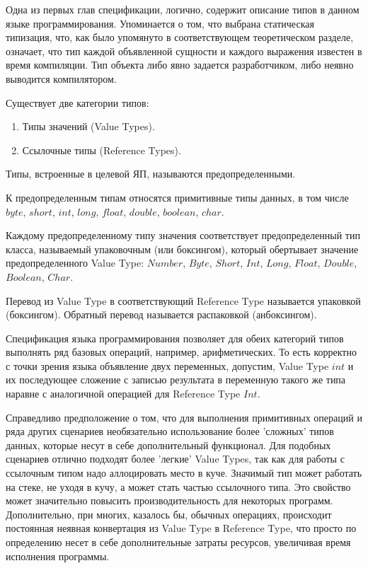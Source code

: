 \documentclass{mipt-thesis-bs}
\begin{document}
Одна из первых глав спецификации, логично, содержит описание типов в данном языке 
программирования. Упоминается о том, что выбрана статическая типизация, что, как 
было упомянуто в соответствующем теоретическом разделе, означает, что тип 
каждой объявленной сущности и каждого выражения известен в
время компиляции. Тип объекта либо явно задается разработчиком, 
либо неявно выводится компилятором.

Существует две категории типов:
\begin{enumerate}
    \item Типы значений (Value Types).
    \item Ссылочные типы (Reference Types).
\end{enumerate}

Типы, встроенные в целевой ЯП, называются предопределенными.

К предопределенным типам относятся примитивные типы данных, в том числе 
$byte$, $short$, $int$, $long$, $float$, $double$, $boolean$, $char$.

Каждому предопределенному типу значения соответствует 
предопределенный тип класса, называемый 
упаковочным (или боксингом), который обертывает значение предопределенного 
Value Type: $Number$, $Byte$, $Short$, $Int$, $Long$, $Float$, $Double$, $Boolean$, $Char$.

Перевод из Value Type в соответствующий Reference Type называется упаковкой
(боксингом). Обратный перевод называется распаковкой (анбоксингом).

Спецификация языка программирования позволяет для обеих категорий типов выполнять ряд
базовых операций, например, арифметических. То есть корректно с точки зрения языка
объявление двух переменных, допустим, Value Type $int$ и их последующее сложение с записью
результата в переменную такого же типа наравне с аналогичной операцией для Reference Type $Int$.

Справедливо предположение о том, что для выполнения примитивных операций и ряда других
сценариев необязательно использование более 'сложных' типов данных, которые несут 
в себе дополнительный функционал.
Для подобных сценариев отлично подходят более 'легкие' Value Types, так как для работы 
с ссылочным типом надо аллоцировать место в куче. Значимый тип может работать на 
стеке, не уходя в кучу, а может стать частью ссылочного типа. 
Это свойство может значительно повысить производительность для некоторых программ.
Дополнительно, при многих, казалось бы, обычных операциях, происходит постоянная неявная
конвертация из Value Type в Reference Type, что просто по определению несет в себе 
дополнительные затраты ресурсов, увеличивая время исполнения программы.
\end{document}

